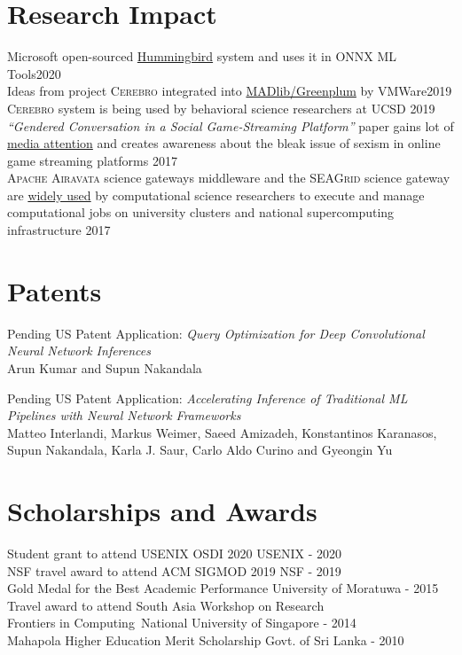 \documentclass[margin]{res}
\begin{document}
\begin{resume}
\section{Research Impact}
Microsoft open-sourced \href{https://github.com/microsoft/hummingbird}{Hummingbird} system and uses it in ONNX ML Tools\hfill 2020\\
Ideas from project \textsc{Cerebro} integrated into \href{https://tanzu.vmware.com/content/blog/model-selection-for-deep-neural-networks-on-greenplum-database}{MADlib/Greenplum} by VMWare\hfill 2019\\
\textsc{Cerebro} system is being used by behavioral science researchers at UCSD \hfill 2019\\
\textit{``Gendered Conversation in a Social Game-Streaming Platform''} paper gains lot of \href{https://docs.google.com/document/d/12zybT3kJb1JaW3c8oSx3hdH4g21MlkHA56C5_mkY_6I/edit?usp=sharing}{media attention} and creates awareness about the bleak issue of sexism in online game streaming platforms \hfill 2017\\
\textsc{Apache Airavata} science gateways middleware and the \textsc{SEAGrid} science gateway are \href{https://seagrid.org/publications/}{widely used} by computational science researchers to execute and manage computational jobs on university clusters and national supercomputing infrastructure \hfill 2017


\section{Patents}
\par
Pending US Patent Application: \textit{Query Optimization for Deep Convolutional Neural Network Inferences}\\
Arun Kumar and Supun Nakandala

\par
Pending US Patent Application: \textit{Accelerating Inference of Traditional ML Pipelines with Neural Network Frameworks}\\
Matteo Interlandi, Markus Weimer, Saeed Amizadeh, Konstantinos Karanasos,
Supun Nakandala, Karla J. Saur, Carlo Aldo Curino and Gyeongin Yu

\vspace{4mm}
\section{Scholarships and Awards}
Student grant to attend USENIX OSDI 2020 \hfill USENIX - 2020\\
NSF travel award to attend ACM SIGMOD 2019 \hfill NSF - 2019\\
Gold Medal for the Best Academic Performance \hfill University of Moratuwa - 2015\\
Travel award to attend South Asia Workshop on Research\\ Frontiers in Computing~\hfill National University of Singapore - 2014\\
Mahapola Higher Education Merit Scholarship \hfill Govt. of Sri Lanka - 2010



\end{resume}
\end{document}
